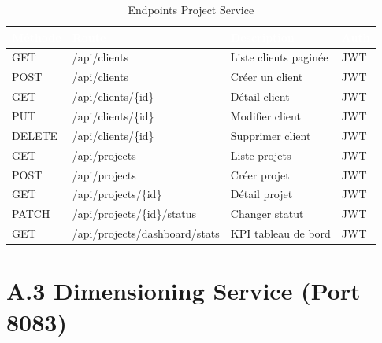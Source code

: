 \begin{table}[H]
  \caption{Endpoints Project Service}
  \centering
  \begin{tabularx}{\textwidth}{|C{1.5cm}|L{5.5cm}|X|C{2cm}|}
    \hline
    \textcolor{white}{\textbf{Méthode}} &
    \textcolor{white}{\textbf{Route}} &
    \textcolor{white}{\textbf{Description}} &
    \textcolor{white}{\textbf{Auth}} \\
    \hline
    GET & /api/clients & Liste clients paginée & JWT \\
    \hline
    POST & /api/clients & Créer un client & JWT \\
    \hline
    GET & /api/clients/\{id\} & Détail client & JWT \\
    \hline
    PUT & /api/clients/\{id\} & Modifier client & JWT \\
    \hline
    DELETE & /api/clients/\{id\} & Supprimer client & JWT \\
    \hline
    GET & /api/projects & Liste projets & JWT \\
    \hline
    POST & /api/projects & Créer projet & JWT \\
    \hline
    GET & /api/projects/\{id\} & Détail projet & JWT \\
    \hline
    PATCH & /api/projects/\{id\}/status & Changer statut & JWT \\
    \hline
    GET & /api/projects/dashboard/stats & KPI tableau de bord & JWT \\
    \hline
  \end{tabularx}
\end{table}

\section*{A.3 Dimensioning Service (Port 8083)}

